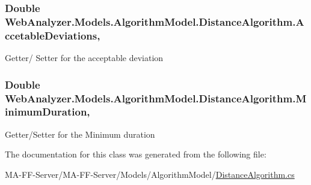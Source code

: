 \subsubsection[{Accetable\+Deviations}]{\setlength{\rightskip}{0pt plus 5cm}Double Web\+Analyzer.\+Models.\+Algorithm\+Model.\+Distance\+Algorithm.\+Accetable\+Deviations\hspace{0.3cm}{\ttfamily [get]}, {\ttfamily [set]}}\label{class_web_analyzer_1_1_models_1_1_algorithm_model_1_1_distance_algorithm_abb27c8690d9554003d172ae39f454110}


Getter/ Setter for the acceptable deviation 

\hypertarget{class_web_analyzer_1_1_models_1_1_algorithm_model_1_1_distance_algorithm_a6dbf956e238fe79191f05d4461ca3a20}{}
\subsubsection[{Minimum\+Duration}]{\setlength{\rightskip}{0pt plus 5cm}Double Web\+Analyzer.\+Models.\+Algorithm\+Model.\+Distance\+Algorithm.\+Minimum\+Duration\hspace{0.3cm}{\ttfamily [get]}, {\ttfamily [set]}}\label{class_web_analyzer_1_1_models_1_1_algorithm_model_1_1_distance_algorithm_a6dbf956e238fe79191f05d4461ca3a20}


Getter/\+Setter for the Minimum duration 



The documentation for this class was generated from the following file\+:\begin{DoxyCompactItemize}
\item 
M\+A-\/\+F\+F-\/\+Server/\+M\+A-\/\+F\+F-\/\+Server/\+Models/\+Algorithm\+Model/\hyperlink{_distance_algorithm_8cs}{Distance\+Algorithm.\+cs}\end{DoxyCompactItemize}
